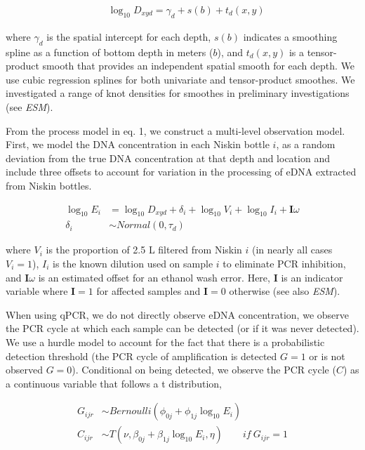 \documentclass[
]{article}
\begin{document}
\begin{align}
  & \log_{10}D_{xyd}=\gamma_d + s(b) + t_d(x,y)
\end{align}

where \(\gamma_d\) is the spatial intercept for each depth, \(s(b)\)
indicates a smoothing spline as a function of bottom depth in meters
(\(b\)), and \(t_d(x,y)\) is a tensor-product smooth that provides an
independent spatial smooth for each depth. We use cubic regression
splines for both univariate and tensor-product smoothes. We investigated
a range of knot densities for smoothes in preliminary investigations (see \emph{ESM}).

From the process model in eq. 1, we construct a multi-level observation
model. First, we model the DNA concentration in each Niskin bottle
\(i\), as a random deviation from the true DNA concentration at that
depth and location and include three offsets to account for variation in
the processing of eDNA extracted from Niskin bottles. 

\begin{align}
  \log_{10}E_{i} &= \log_{10}D_{xyd} + \delta_i + \log_{10}{V_i} + \log_{10}{I_i}  + \mathbf{I}\omega\\
  \delta_i & \sim Normal(0,\tau_d)
\end{align} 

where \(V_i\) is the proportion of 2.5 L filtered from
Niskin \(i\) (in nearly all cases \(V_i = 1\)), \(I_i\) is the known
dilution used on sample \(i\) to eliminate PCR inhibition, and
\(\mathbf{I}\omega\) is an estimated offset for an ethanol wash error. 
Here, \(\mathbf{I}\) is an indicator variable where \(\mathbf{I}=1\) for affected samples and
\(\mathbf{I}=0\) otherwise (see also \emph{ESM}).

When using qPCR, we do not directly observe eDNA concentration, we
observe the PCR cycle at which each sample can be detected (or if it was
never detected). We use a hurdle model to account for the fact that
there is a probabilistic detection threshold (the PCR cycle of
amplification is detected \(G=1\) or is not observed \(G=0\)).
Conditional on being detected, we observe the PCR cycle (\(C\)) as a
continuous variable that follows a t distribution,

\begin{align}
  G_{ijr} &\sim Bernoulli(\phi_{0j}+\phi_{1j}\log_{10}E_{i})\\
  C_{ijr} &\sim T(\nu,\beta_{0j}+\beta_{1j}\log_{10}E_{i},\eta) \qquad  if \: G_{ijr} = 1
\end{align}
\end{document}
